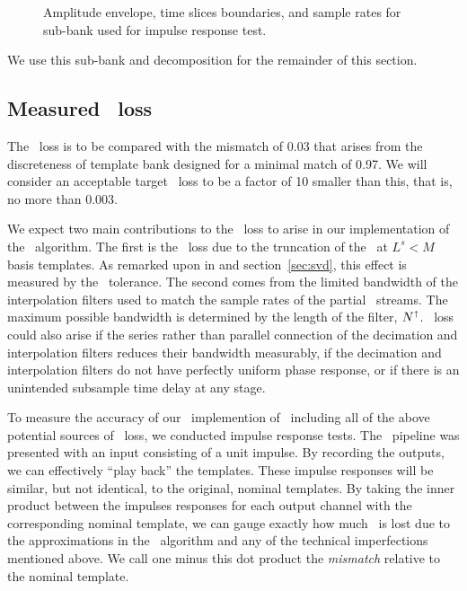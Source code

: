 %
\begin{figure}[h]
	\caption{\label{fig:envelope}Amplitude envelope, time slices boundaries, and sample rates for sub-bank used for impulse response test.}
\end{figure}
%
We use this sub-bank and decomposition for the remainder of this section.

\subsection{Measured \SNR\ loss}

The \SNR\ loss is to be compared with the mismatch of 0.03 that arises from the
discreteness of template bank designed for a minimal match of 0.97.  We will consider
an acceptable target \SNR\ loss to be a factor of 10 smaller than this, that is, no more
than 0.003.

We expect two main contributions to the \SNR\ loss to arise in our
implementation of the \lloid\ algorithm.  The first is the \SNR\ loss due to
the truncation of the \SVD\ at $L^s < M$ basis templates.  As remarked upon in
\citet{Cannon:2010p10398} and section~\ref{sec:svd}, this effect is measured by
the \SVD\ tolerance.  The second comes from the limited bandwidth of the
interpolation filters used to match the sample rates of the partial \SNR\ streams.
The maximum possible bandwidth is determined by the length of the filter,
$N^\shortuparrow$.  \SNR\ loss could also arise if the series rather than parallel
connection of the decimation and interpolation filters reduces their bandwidth
measurably, if the decimation and interpolation filters do not have perfectly uniform
phase response, or if there is an unintended subsample time delay at any stage.

To measure the accuracy of our \gstreamer\ implemention of \lloid\ including all of
the above potential sources of \SNR\ loss, we conducted impulse response tests.  The
\gstreamer\ pipeline was presented with an input consisting of a unit impulse.  By
recording the outputs, we can effectively ``play back'' the templates.  These impulse
responses will be similar, but not identical, to the original, nominal templates.  By
taking the inner product between the impulses responses for each output 
channel with the corresponding nominal template, we can gauge exactly how much \SNR\
is lost due to the approximations in the \lloid\ algorithm and any of the technical
imperfections mentioned above.  We call one minus this dot product the \emph{mismatch}
relative to the nominal template.


